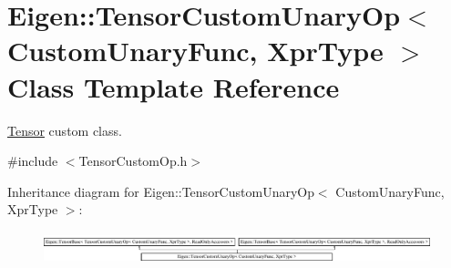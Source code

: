 \hypertarget{class_eigen_1_1_tensor_custom_unary_op}{}\section{Eigen\+:\+:Tensor\+Custom\+Unary\+Op$<$ Custom\+Unary\+Func, Xpr\+Type $>$ Class Template Reference}
\label{class_eigen_1_1_tensor_custom_unary_op}


\hyperlink{class_eigen_1_1_tensor}{Tensor} custom class.  




{\ttfamily \#include $<$Tensor\+Custom\+Op.\+h$>$}

Inheritance diagram for Eigen\+:\+:Tensor\+Custom\+Unary\+Op$<$ Custom\+Unary\+Func, Xpr\+Type $>$\+:\begin{figure}[H]
\begin{center}
\leavevmode
\includegraphics[height=0.947547cm]{class_eigen_1_1_tensor_custom_unary_op}
\end{center}
\end{figure}
